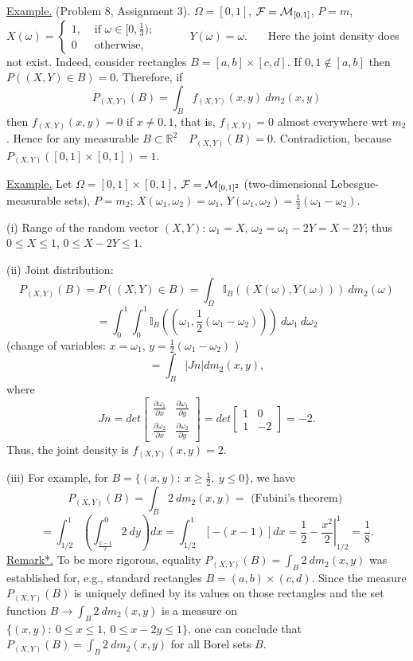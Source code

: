 \documentclass[a4paper,10pt]{article}
\def\RR{\mathbb{R}}
\def\II{\mathbb{I}}
\newcommand{\1}[1]{\mathbf{1}_{\{#1\}}}
\begin{document}
\underline{Example.} (Problem 8, Assignment 3). $\Omega=[0,1]$, ${\cal F}={\cal M}_{[0,1]}$, $P=m$, $X(\omega)=\left\{\begin{array}{ll} 1, & \mbox{ if } \omega\in [0,\frac{1}{3}); \\ 0 & \mbox{ otherwise}, \end{array}\right.$~~~~~ $Y(\omega)=\omega$.~~~ Here the joint density does not exist. Indeed, consider rectangles $B=[a,b]\times[c,d]$. If $0,1\notin[a,b]$ then $P((X,Y)\in B)=0$. Therefore, if
  $$P_{(X,Y)}(B)=\int_B f_{(X,Y)}(x,y)~ dm_2(x,y)$$
then $f_{(X,Y)}(x,y)=0$ if $x\ne 0,1$, that is, $f_{(X,Y)}=0$ almost everywhere wrt $m_2$. Hence for any measurable $B\subset \RR^2$~~$P_{(X,Y)}(B)=0$. Contradiction, because $P_{(X,Y)}([0,1]\times[0,1])=1$.\vspace{3mm}

\underline{Example.} Let $\Omega=[0,1]\times[0,1]$, ${\cal F}={\cal M}_{[0,1]^2}$ (two-dimensional Lebesgue-measurable sets), $P=m_2$; $X(\omega_1,\omega_2)=\omega_1$, $Y(\omega_1,\omega_2)=\frac{1}{2}(\omega_1-\omega_2)$.

(i) Range of the random vector $(X,Y)$: $\omega_1=X$, $\omega_2=\omega_1-2Y=X-2Y$; thus $0\le X\le 1$, $0\le X-2Y\le 1$. \vspace{5cm}

(ii) Joint distribution:
  $$P_{(X,Y)}(B)=P((X,Y)\in B)=\int_\Omega \II_B((X(\omega),Y(\omega)))~dm_2(\omega)$$
  $$=\int_0^1\int_0^1 \II_B((\omega_1,\frac{1}{2}(\omega_1-\omega_2)))~d\omega_1~d\omega_2$$
(change of variables: $x=\omega_1$, $y=\frac{1}{2}(\omega_1-\omega_2)$ )
  $$=\int_B |Jn| dm_2(x,y),$$
where
  $$Jn=det\left[\begin{array}{cc}
\frac{\partial \omega_1}{\partial x} & \frac{\partial \omega_1}{\partial y} \\
\frac{\partial \omega_2}{\partial x} & \frac{\partial \omega_2}{\partial y} \end{array}\right]=det\left[\begin{array}{cc} 1 & 0 \\ 1 & -2 \end{array}\right]=-2.$$
Thus, the joint density is $f_{(X,Y)}(x,y)=2$.

(iii) For example, for $B=\{(x,y):~ x\ge \frac{1}{2},~y\le 0\}$, we have
  $$P_{(X,Y)}(B)=\int_B 2 ~dm_2(x,y)= \mbox{ (Fubini's theorem) }$$
  $$=\int_{1/2}^1\left(\int_{\frac{x-1}{2}}^0 2~dy\right)dx=\int_{1/2}^1 [-(x-1)]dx=\frac{1}{2}-\left.\frac{x^2}{2}\right|_{1/2}^1=\frac{1}{8}.$$
\underline{Remark*.} To be more rigorous, equality $P_{(X,Y)}(B)=\int_B 2~dm_2(x,y)$ was established for, e.g., standard rectangles $B=(a,b)\times(c,d)$. Since the measure $P_{(X,Y)}(B)$ is uniquely defined by its values on those rectangles and the set function $B\to \int_B 2~dm_2(x,y)$ is a measure on $\{(x,y):~0\le x\le 1,~0\le x-2y\le 1\}$, one can conclude that $P_{(X,Y)}(B)=\int_B 2~dm_2(x,y)$ for all Borel sets $B$.
\vspace{3mm}
\end{document}
